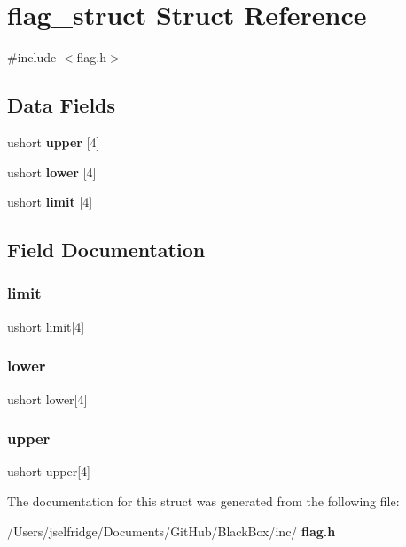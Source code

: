 \section{flag\+\_\+struct Struct Reference}
\label{structflag__struct}


{\ttfamily \#include $<$flag.\+h$>$}

\subsection*{Data Fields}
\begin{DoxyCompactItemize}
\item 
ushort \textbf{ upper} [4]
\item 
ushort \textbf{ lower} [4]
\item 
ushort \textbf{ limit} [4]
\end{DoxyCompactItemize}


\subsection{Field Documentation}
\mbox{\label{structflag__struct_ac42d579fedd8c217828993f62f0a288a}} 
\subsubsection{limit}
{\footnotesize\ttfamily ushort limit[4]}

\mbox{\label{structflag__struct_afdb2c288f1de026f88deaba55a024788}} 
\subsubsection{lower}
{\footnotesize\ttfamily ushort lower[4]}

\mbox{\label{structflag__struct_a3e14daa8ee2de9ff7673df2756b25589}} 
\subsubsection{upper}
{\footnotesize\ttfamily ushort upper[4]}



The documentation for this struct was generated from the following file\+:\begin{DoxyCompactItemize}
\item 
/\+Users/jselfridge/\+Documents/\+Git\+Hub/\+Black\+Box/inc/\textbf{ flag.\+h}\end{DoxyCompactItemize}

